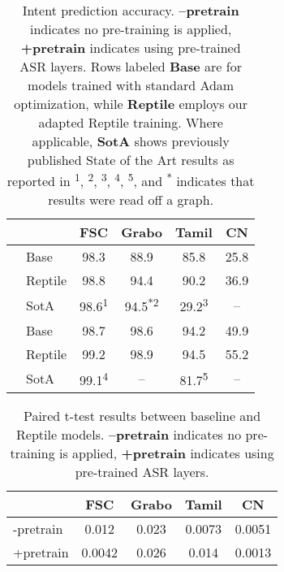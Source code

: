 \documentclass[a4paper]{article}
\begin{document}
	\begin{table}
		\caption{Intent prediction accuracy. \textbf{--pretrain} indicates no pre-training is applied, \textbf{+pretrain} indicates using pre-trained ASR layers. Rows labeled \textbf{Base} are for models trained with standard Adam optimization, while \textbf{Reptile} employs our adapted Reptile training. Where applicable, \textbf{SotA} shows previously published State of the Art results as reported in {\footnotesize \textsuperscript{1}\cite{architecture}, \textsuperscript{2}\cite{CapsuleSLU}, \textsuperscript{3}\cite{karunanayake-etal-2019-transfer}, \textsuperscript{4}\cite{lugosch2019using}, \textsuperscript{5}\cite{karunanayakesinhala}}, and \textsuperscript{*} indicates that results were read off a graph.}
		\label{tab:results}
		\centering
		\setlength{\tabcolsep}{5pt}
		\begin{tabular}{ll|cccc}
			\toprule
			& & FSC & Grabo & Tamil & CN\\
			\midrule
			\parbox[t]{1ex}{} & Base & 98.3 & 88.9 & 85.8 & 25.8\\
			& Reptile & 98.8 & 94.4 & 90.2 & 36.9\\
			& SotA & \hspace{1ex}98.6\textsuperscript{1} & \hspace{2ex}94.5\textsuperscript{*2} & \hspace{1ex}29.2\textsuperscript{3} & --\\
			\midrule
			\parbox[t]{1ex}{} & Base & 98.7 & 98.6 & 94.2 & 49.9\\
			
			& Reptile & 99.2 & 98.9 & 94.5 & 55.2\\
			& SotA & \hspace{1ex}99.1\textsuperscript{4} & -- & \hspace{1ex}81.7\textsuperscript{5} & --\\
			\bottomrule
		\end{tabular}
		
	\end{table}

\begin{table}
	\caption{Paired t-test results between baseline and Reptile models. \textbf{--pretrain} indicates no pre-training is applied, \textbf{+pretrain} indicates using pre-trained ASR layers. }
	\label{tab:ttest}
	\centering
	\setlength{\tabcolsep}{5pt}
	\begin{tabular}{l|cccc}
		\toprule
		& FSC & Grabo & Tamil & CN\\
		\midrule
		-pretrain & 0.012 & 0.023 & 0.0073 & 0.0051\\
		\midrule
		+pretrain & 0.0042 & 0.026 & 0.014 & 0.0013\\
		\bottomrule
	\end{tabular}
	
\end{table}
\end{document}
